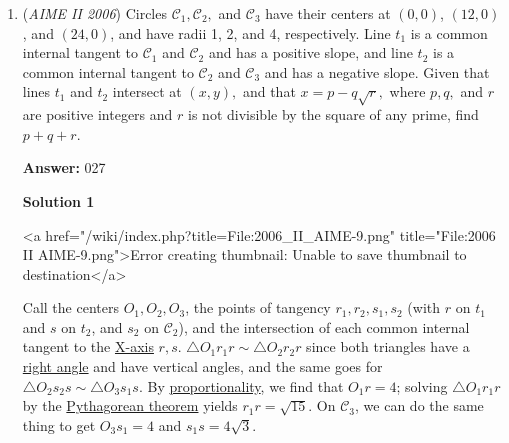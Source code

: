 \begin{enumerate}
 All in all, we have 

 
 \[\frac1{6}\Big(\underbrace{1296}_{0^\circ} +\underbrace{36}_{120^\circ} +\underbrace{36}_{240^\circ} +\underbrace{216+216+216}_{\text{3 reflections}}\Big)\]

 which we can quickly evaluate to $\boxed{336}$. 

 For the case of this big triangle, the number of rotations and reflections upon this triangle is denoted as $D_3$, where $D$ is called the \textbf{dihedral group}, and 3 represents the number of plausible rotations upon this group (of course, accounting reflections of course ;) ).

 The process of applying the above information to any given dihedral group $D_n$ is called the \href{https://artofproblemsolving.com/wiki/index.php?title=Burnside\%27s\_Lemma}{Burnside's Lemma}.

 


	\item (\textit{AIME II 2006}) Circles $\mathcal{C}_1, \mathcal{C}_2,$ and $\mathcal{C}_3$ have their centers at $(0,0)$, $(12,0)$, and $(24,0)$, and have radii 1, 2, and 4, respectively. Line $t_1$ is a common internal tangent to $\mathcal{C}_1$ and $\mathcal{C}_2$ and has a positive slope, and line $t_2$ is a common internal tangent to $\mathcal{C}_2$ and $\mathcal{C}_3$ and has a negative slope. Given that lines $t_1$ and $t_2$ intersect at $(x,y),$ and that $x=p-q\sqrt{r},$ where $p, q,$ and $r$ are positive integers and $r$ is not divisible by the square of any prime, find $p+q+r.$

 \textbf{Answer: }027



\textbf{Solution 1}

<a href="/wiki/index.php?title=File:2006\_II\_AIME-9.png" title="File:2006 II AIME-9.png">Error creating thumbnail: Unable to save thumbnail to destination</a>

 Call the centers $O_1, O_2, O_3$, the points of tangency $r_1, r_2, s_1, s_2$ (with $r$ on $t_1$ and $s$ on $t_2$, and $s_2$ on $\mathcal{C}_2$), and the intersection of each common internal tangent to the \href{https://artofproblemsolving.com/wiki/index.php?title=X-axis}{X-axis} $r, s$. $\triangle O_1r_1r \sim \triangle O_2r_2r$ since both triangles have a \href{https://artofproblemsolving.com/wiki/index.php?title=Right\_angle}{right angle} and have vertical angles, and the same goes for $\triangle O_2s_2s \sim \triangle O_3s_1s$. By \href{https://artofproblemsolving.com/wiki/index.php?title=Proportion}{proportionality}, we find that $O_1r = 4$; solving $\triangle O_1r_1r$ by the \href{https://artofproblemsolving.com/wiki/index.php?title=Pythagorean\_theorem}{Pythagorean theorem} yields $r_1r = \sqrt{15}$. On $\mathcal{C}_3$, we can do the same thing to get $O_3s_1 = 4$ and $s_1s = 4\sqrt{3}$.


\end{enumerate}

